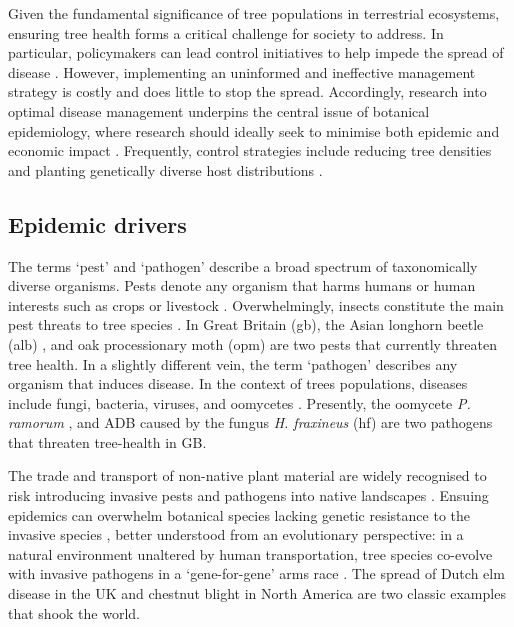 Given the fundamental significance of tree populations in terrestrial ecosystems, ensuring tree health forms a critical challenge for society to address.
In particular, policymakers can lead control initiatives to help impede the spread of disease \cite{Gilligan-disease-management}.
However, implementing an uninformed and ineffective management strategy is costly and does little to stop the spread.
Accordingly, research into optimal disease management underpins the central issue of botanical epidemiology, 
where research should ideally seek to minimise both epidemic and economic impact \cite{ash-dieback-costs, freer2017tree, boyd2013consequence, tyrvainen2005benefits}. 
Frequently, control strategies include reducing tree densities \cite{pietzsch2021effect, resiliency-density-reductions} and planting genetically diverse host distributions \cite{doi:10.1094/PD-89-0969, genetic-heterogeneity, huang1980importance}.

\subsection{Epidemic drivers}

The terms `pest' and `pathogen' describe a broad spectrum of taxonomically diverse organisms. 
Pests denote any organism that harms humans or human interests such as crops or livestock
\cite{buckle2015rodent, oerke2006crop, de1964biological}. Overwhelmingly, insects constitute the main
pest threats to tree species \cite{metcalf1994introduction}. In Great Britain (\acrshort{gb}), the Asian longhorn beetle
(\acrshort{alb}) \cite{haack2010managing}, and oak processionary moth (\acrshort{opm}) \cite{tomlinson2015managing} are two pests that currently threaten tree health.
In a slightly different vein, the term `pathogen' describes any organism that induces disease. 
In the context of trees populations, diseases include fungi, bacteria, viruses, and oomycetes \cite{balloux2017q, Boyd1235773}.
Presently, the oomycete \textit{P. ramorum} \cite{brasier2005phytophthora}, and ADB
caused by the fungus \textit{H. fraxineus} (\acrshort{hf}) \cite{ash-dieback-costs, mitchell2014ash} are two pathogens
that threaten tree-health in GB.

The trade and transport of non-native plant material are widely recognised to risk introducing invasive pests and pathogens into native landscapes \cite{POTTER201761, lovett2016nonnative, roy2014increasing}.
Ensuing epidemics can overwhelm botanical species lacking genetic resistance to the invasive species \cite{desprez2016evolutionary}, better understood from an evolutionary perspective: in a natural environment unaltered by human transportation, tree species co-evolve with invasive pathogens in a `gene-for-gene' arms race \cite{Thrall1735, dangl2001plant, flor1971current}.
The spread of Dutch elm disease in the UK \cite{doi:10.1111/j.1365-3059.2010.02391.x} and chestnut blight
in North America \cite{doi:10.1002/9780470535486.ch7} are two classic examples that shook the world.

